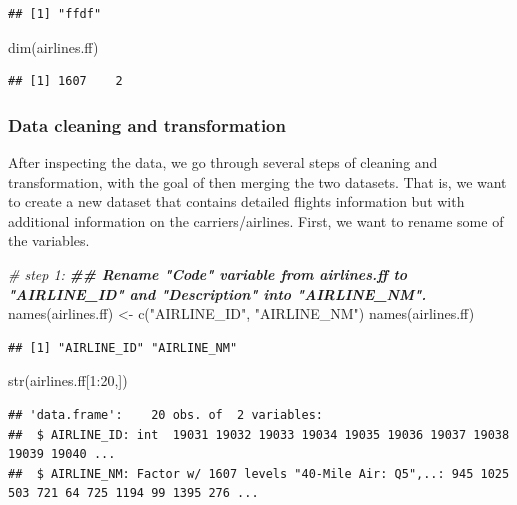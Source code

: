 \documentclass[
  12pt,
]{style/krantz}
\newenvironment{Shaded}{\begin{snugshade}}{\end{snugshade}}
\newcommand{\CommentTok}[1]{\textcolor[rgb]{0.56,0.35,0.01}{\textit{#1}}}
\newcommand{\DecValTok}[1]{\textcolor[rgb]{0.00,0.00,0.81}{#1}}
\newcommand{\DocumentationTok}[1]{\textcolor[rgb]{0.56,0.35,0.01}{\textbf{\textit{#1}}}}
\newcommand{\FunctionTok}[1]{\textcolor[rgb]{0.00,0.00,0.00}{#1}}
\newcommand{\NormalTok}[1]{#1}
\newcommand{\OtherTok}[1]{\textcolor[rgb]{0.56,0.35,0.01}{#1}}
\newcommand{\SpecialCharTok}[1]{\textcolor[rgb]{0.00,0.00,0.00}{#1}}
\newcommand{\StringTok}[1]{\textcolor[rgb]{0.31,0.60,0.02}{#1}}
\begin{document}
\begin{verbatim}
## [1] "ffdf"
\end{verbatim}

\begin{Shaded}
\begin{Highlighting}[]
\FunctionTok{dim}\NormalTok{(airlines.ff)}
\end{Highlighting}
\end{Shaded}

\begin{verbatim}
## [1] 1607    2
\end{verbatim}

\hypertarget{data-cleaning-and-transformation}{%
\subsubsection{Data cleaning and transformation}\label{data-cleaning-and-transformation}}

After inspecting the data, we go through several steps of cleaning and transformation, with the goal of then merging the two datasets. That is, we want to create a new dataset that contains detailed flights information but with additional information on the carriers/airlines. First, we want to rename some of the variables.

\begin{Shaded}
\begin{Highlighting}[]
\CommentTok{\# step 1: }
\DocumentationTok{\#\# Rename "Code" variable from airlines.ff to "AIRLINE\_ID" and "Description" into "AIRLINE\_NM".}
\FunctionTok{names}\NormalTok{(airlines.ff) }\OtherTok{\textless{}{-}} \FunctionTok{c}\NormalTok{(}\StringTok{"AIRLINE\_ID"}\NormalTok{, }\StringTok{"AIRLINE\_NM"}\NormalTok{)}
\FunctionTok{names}\NormalTok{(airlines.ff)}
\end{Highlighting}
\end{Shaded}

\begin{verbatim}
## [1] "AIRLINE_ID" "AIRLINE_NM"
\end{verbatim}

\begin{Shaded}
\begin{Highlighting}[]
\FunctionTok{str}\NormalTok{(airlines.ff[}\DecValTok{1}\SpecialCharTok{:}\DecValTok{20}\NormalTok{,])}
\end{Highlighting}
\end{Shaded}

\begin{verbatim}
## 'data.frame':    20 obs. of  2 variables:
##  $ AIRLINE_ID: int  19031 19032 19033 19034 19035 19036 19037 19038 19039 19040 ...
##  $ AIRLINE_NM: Factor w/ 1607 levels "40-Mile Air: Q5",..: 945 1025 503 721 64 725 1194 99 1395 276 ...
\end{verbatim}
\end{document}
